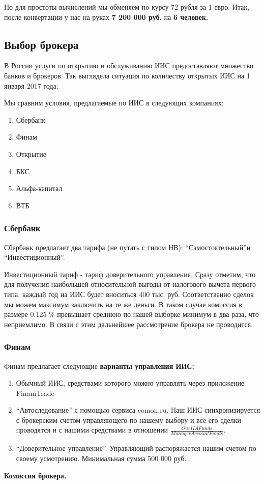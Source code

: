 Но для простоты вычислений мы обменяем по курсу 72 рубля за 1 евро.
\nopagebreak Итак, после конвертации у нас на руках \textbf{7 200 000 руб.} на \textbf{6 человек.}
\subsection{Выбор брокера}
В России услуги по открытию и обслуживанию ИИС предоставляют множество банков и брокеров. Так выглядела ситуация по количеству открытых ИИС на 1 января 2017 года:

Мы сравним условия, предлагаемые по ИИС в следующих компаниях:
\begin{enumerate}
    \item Сбербанк
    \item Финам
    \item Открытие
    \item БКС
    \item Альфа-капитал
    \item ВТБ
\end{enumerate}

\subsubsection{Сбербанк}
Сбербанк предлагает два тарифа (не путать с типом НВ): ``Самостоятельный''и ``Инвестиционный''. 

Инвестиционный тариф - тариф доверительного управления. Сразу отметим, что для получения наибольшей относительной выгоды от налогового вычета первого типа, каждый год на ИИС будет вноситься 400 тыс. руб. Соответственно сделок мы можем максимум заключить на те же деньги. В таком случае комиссия в размере 0.125 \% превышает среднюю по нашей выборке минимум в два раза, что неприемлимо. В связи с этим дальнейшее рассмотрение брокера не проводится.

\subsubsection{Финам}
Финам предлагает следующие \textbf{варианты управления ИИС:}
\begin{enumerate}
    \item Обычный ИИС, средствами которого можно управлять через приложение FinamTrade
    \item ``Автоследование'' с помощью сервиса comon.ru. Наш ИИС синхронизируется с брокерским счетом управляющего по нашему выбору и все его сделки проводятся и с нашими средствами в отношении $\frac{OurIIAFunds}{ManagerAccountFunds}$.
    \item ``Доверительное управление''. Управляющий распоряжается нашим счетом по своему усмотрению. Минимальная сумма 500 000 руб.
\end{enumerate}
\textbf{Комиссия брокера.}

